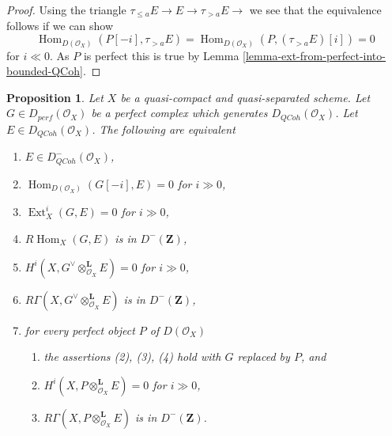 \documentclass{stacks-project}
\theoremstyle{plain}
\newtheorem{proposition}[subsection]{Proposition}
\theoremstyle{definition}
\theoremstyle{remark}
\numberwithin{equation}{subsection}
\def\Hom{\mathop{\mathrm{Hom}}\nolimits}
\def\Ext{\mathop{\mathrm{Ext}}\nolimits}
\def\QCoh{\mathit{QCoh}}
\begin{document}
\begin{proof}
Using the triangle $ \tau_{\leq a} E \to E \to \tau_{> a} E \to$
we see that the equivalence follows if we can show
$$
\Hom_{D(\mathcal{O}_X)}(P[-i], \tau_{> a} E) =
\Hom_{D(\mathcal{O}_X)}(P, (\tau_{> a} E)[i]) = 0
$$
for $i \ll 0$. As $P$ is perfect this is true by
Lemma \ref{lemma-ext-from-perfect-into-bounded-QCoh}.
\end{proof}

\begin{proposition}
\label{proposition-detecting-bounded-above}
Let $X$ be a quasi-compact and quasi-separated scheme. Let
$G \in D_{perf}(\mathcal{O}_X)$ be a perfect complex which generates 
$D_\QCoh (\mathcal{O}_X)$. Let $E \in D_\QCoh (\mathcal{O}_X)$.
The following are equivalent
\begin{enumerate}
\item $E \in D^-_\QCoh (\mathcal{O}_X)$,
\item $\Hom_{D(\mathcal{O}_X)}(G[-i], E) = 0$ for $i \gg 0$,
\item $\Ext^i_X(G, E) = 0$ for $i \gg 0$,
\item $R\Hom_X(G, E)$ is in $D^-(\mathbf{Z})$,
\item $H^i(X, G^\vee \otimes_{\mathcal{O}_X}^\mathbf{L} E) = 0$
for $i \gg 0$,
\item $R\Gamma(X, G^\vee \otimes_{\mathcal{O}_X}^\mathbf{L} E)$
is in $D^-(\mathbf{Z})$,
\item for every perfect object $P$ of $D(\mathcal{O}_X)$
\begin{enumerate}
\item the assertions (2), (3), (4) hold with $G$ replaced by $P$, and
\item $H^i(X, P \otimes_{\mathcal{O}_X}^\mathbf{L} E) = 0$ for $i \gg 0$,
\item $R\Gamma(X, P \otimes_{\mathcal{O}_X}^\mathbf{L} E)$
is in $D^-(\mathbf{Z})$.
\end{enumerate}
\end{enumerate}
\end{proposition}
\end{document}
